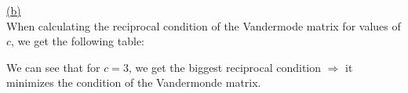\documentclass[12pt]{article}
\begin{document}
\newpage\hyperlink{toc}{\hypertarget{3.2}{(b)}}\\
When calculating the reciprocal condition of the Vandermode matrix for values of $c$,
we get the following table:
\begin{center}
\end{center}
We can see that for $c=3$, we get the biggest reciprocal condition $\Longrightarrow$ it minimizes the condition of the Vandermonde matrix.
\end{document}
